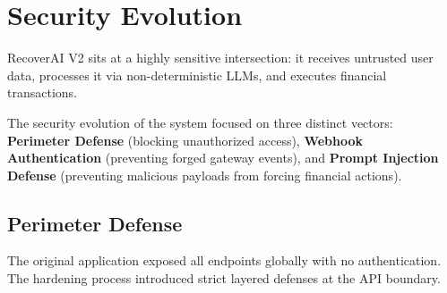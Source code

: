 
\section{Security Evolution}

\begin{tcolorbox}[summarybox={\iconShield[1.5] Securing the Perimeter \& the Core}]
\color{textdark}
RecoverAI V2 sits at a highly sensitive intersection: it receives untrusted user data, processes it via non-deterministic LLMs, and executes financial transactions. 

The security evolution of the system focused on three distinct vectors: \textbf{Perimeter Defense} (blocking unauthorized access), \textbf{Webhook Authentication} (preventing forged gateway events), and \textbf{Prompt Injection Defense} (preventing malicious payloads from forcing financial actions).
\end{tcolorbox}

\vspace{0.8cm}

\subsection{Perimeter Defense}

The original application exposed all endpoints globally with no authentication. The hardening process introduced strict layered defenses at the API boundary.

